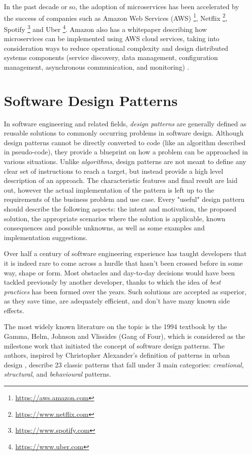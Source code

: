 In the past decade or so, the adoption of microservices has been accelerated by the success of companies such as Amazon Web Services (AWS) \footnote{\url{https://aws.amazon.com}}, Netflix \footnote{\url{https://www.netflix.com}}, Spotify \footnote{\url{https://www.spotify.com}} and Uber \footnote{\url{https://www.uber.com}}. Amazon also has a whitepaper describing how microservices can be implemented using AWS cloud services, taking into consideration ways to reduce operational complexity and design distributed systems components (service discovery, data management, configuration management, asynchronous communication, and monitoring) \cite{aws-microservices}.

\section{Software Design Patterns}

In software engineering and related fields, \textit{design patterns} are generally defined as reusable solutions to commonly occurring problems in software design. Although design patterns cannot be directly converted to code (like an algorithm described in pseudo-code), they provide a blueprint on how a problem can be approached in various situations. Unlike \textit{algorithms}, design patterns are not meant to define any clear set of instructions to reach a target, but instead provide a high level description of an approach. The characteristic features and final result are laid out, however the actual implementation of the pattern is left up to the requirements of the business problem and use case. Every "useful" design pattern should describe the following aspects: the intent and motivation, the proposed solution, the appropriate scenarios where the solution is applicable, known consequences and possible unknowns, as well as some examples and implementation suggestions.

Over half a century of software engineering experience has taught developers that it is indeed rare to come across a hurdle that hasn't been crossed before in some way, shape or form. Most obstacles and day-to-day decisions would have been tackled previously by another developer, thanks to which the idea of \textit{best practices} has been formed over the years. Such solutions are accepted as superior, as they save time, are adequately efficient, and don't have many known side effects.

The most widely known literature on the topic is the 1994 textbook \cite{gof94} by the Gamma, Helm, Johnson and Vlissides (Gang of Four), which is considered as the milestone work that initiated the concept of software design patterns. The authors, inspired by Christopher Alexander's definition of patterns in urban design \cite{alexander77}, describe 23 classic patterns that fall under 3 main categories: \textit{creational, structural}, and \textit{behavioural} patterns.


